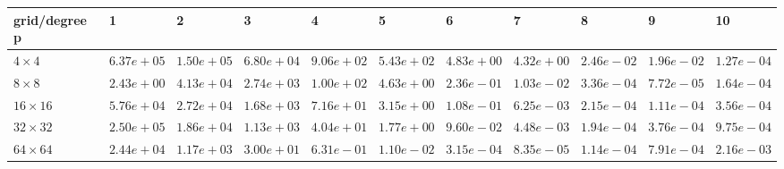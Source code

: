 \begin{tabular}{lllllllllll}
\hline
 grid/degree p   & 1          & 2          & 3          & 4          & 5          & 6          & 7          & 8          & 9          & 10         \\
\hline
 $4 \times 4$    & $6.37e+05$ & $1.50e+05$ & $6.80e+04$ & $9.06e+02$ & $5.43e+02$ & $4.83e+00$ & $4.32e+00$ & $2.46e-02$ & $1.96e-02$ & $1.27e-04$ \\
 $8 \times 8$    & $2.43e+00$ & $4.13e+04$ & $2.74e+03$ & $1.00e+02$ & $4.63e+00$ & $2.36e-01$ & $1.03e-02$ & $3.36e-04$ & $7.72e-05$ & $1.64e-04$ \\
 $16 \times 16$  & $5.76e+04$ & $2.72e+04$ & $1.68e+03$ & $7.16e+01$ & $3.15e+00$ & $1.08e-01$ & $6.25e-03$ & $2.15e-04$ & $1.11e-04$ & $3.56e-04$ \\
 $32 \times 32$  & $2.50e+05$ & $1.86e+04$ & $1.13e+03$ & $4.04e+01$ & $1.77e+00$ & $9.60e-02$ & $4.48e-03$ & $1.94e-04$ & $3.76e-04$ & $9.75e-04$ \\
 $64 \times 64$  & $2.44e+04$ & $1.17e+03$ & $3.00e+01$ & $6.31e-01$ & $1.10e-02$ & $3.15e-04$ & $8.35e-05$ & $1.14e-04$ & $7.91e-04$ & $2.16e-03$ \\
\hline
\end{tabular}
